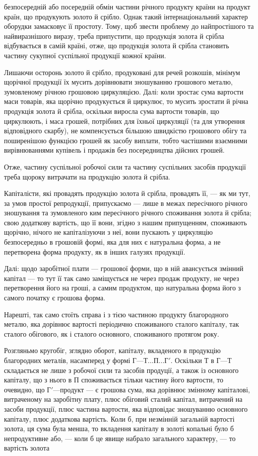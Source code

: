 \parcont{}  %
безпосередній або посередній обмін частини річного продукту країни на
продукт країн, що продукують золото й срібло. Однак такий інтернаціональний
характер оборудки замасковує її простоту. Тому, щоб звести
проблему до найпростішого та найвиразнішого виразу, треба припустити,
що продукція золота й срібла відбувається в самій країні, отже, що продукція
золота й срібла становить частину сукупної суспільної продукції
кожної країни.

Лишаючи осторонь золото й срібло, продуковані для речей розкошів,
мінімум щорічної продукції їх мусить дорівнювати зношуванню грошового
металю, зумовленому річною грошовою циркуляцією. Далі: коли
зростає сума вартости маси товарів, яка щорічно продукується й циркулює,
то мусить зростати й річна продукція золота й срібла, оскільки
виросла сума вартости товарів, що циркулюють, і маса грошей, потрібних
для їхньої циркуляції (та для утворення відповідного скарбу), не компенсується
більшою швидкістю грошового обігу та поширенішою функцією
грошей як засобу виплати, тобто частішими взаємними вирівнюваннями
купівель і продажів без посередництва дійсних грошей.

Отже, частину суспільної робочої сили та частину суспільних засобів
продукції треба щороку витрачати на продукцію золота й срібла.

Капіталісти, які провадять продукцію золота й срібла, провадять її, —
як ми тут, за умов простої репродукції, припускаємо — лише в межах
пересічного річного зношування та зумовленого ким пересічного річного
споживання золота й срібла; свою додаткову вартість, що її вони, згідно
з нашим припущенням, споживають щорічно, нічого не капіталізуючи з
неї, вони пускають у циркуляцію безпосередньо в грошовій формі, яка
для них є натуральна форма, а не перетворена форма продукту, як в інших
галузях продукції.

Далі: щодо заробітної плати — грошової форми, що в ній авансується
змінний капітал — то тут її так само заміщується не через продаж
продукту, не через перетворення його на гроші, а самим продуктом, що
натуральна форма його з самого початку є грошова форма.

Нарешті, так само стоїть справа і з тією частиною продукту благородного
металю, яка дорівнює вартості періодично споживаного сталого
капіталу, так сталого обігового, як і сталого основного, споживаного протягом
року.

Розгляньмо кругобіг, зглядно оборот, капіталу, вкладеного в продукцію
благородних металів, насамперед у формі $Г — Т... П... Г'$. Оскільки
Т в $Г — Т$ складається не лише з робочої сили та засобів продуції, а також
із основного капіталу, що з нього в П споживається тільки частину
його вартости, то очевидно, що $Г' — п$родукт — є грошова сума, яка
дорівнює змінному капіталові, витраченому на заробітну плату, плюс обіговий
сталий капітал, витрачений на засоби продукції, плюс частина
вартости, яка відповідає зношуванню основного капіталу, плюс додаткова
вартість. Коли б, при незмінній загальній вартості золота, ця сума була
менша, то вкладення капіталу в золоті копальні було б непродуктивне
або, — коли б це явище набрало загального характеру, — то вартість золота
\parbreak{}  %

